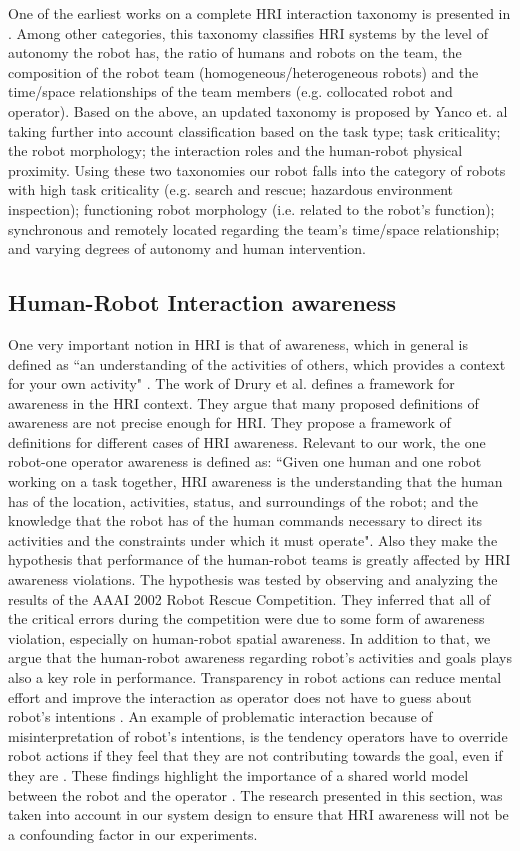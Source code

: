 \documentclass[a4paper,12pt,oneside,openright]{bhamthesis}
\begin{document}
One of the earliest works on a complete HRI interaction taxonomy is presented in \cite{Yanco2002}. Among other categories, this taxonomy classifies HRI systems by the level of autonomy the robot has, the ratio of humans and robots on the team, the composition of the robot team (homogeneous/heterogeneous robots) and the time/space relationships of the team members (e.g. collocated robot and operator). Based on the above, an updated taxonomy is proposed by Yanco et. al \cite{Yanco2004b} taking further into account classification based on the task type; task criticality; the robot morphology; the interaction roles and the human-robot physical proximity. Using these two taxonomies our robot falls into the category of robots with high task criticality (e.g. search and rescue; hazardous environment inspection); functioning robot morphology (i.e. related to the robot's function); synchronous and remotely located regarding the team's time/space relationship; and varying degrees of autonomy and human intervention.

\subsection{Human-Robot Interaction awareness}
One very important notion in HRI is that of awareness, which in general is defined as ``an understanding of the activities of others, which provides a context for your own activity" \cite{Dourish1992}. The work of Drury et al. \cite{Drury2003} defines a framework for awareness in the HRI context. They argue that many proposed definitions of awareness are not precise enough for HRI. They propose a framework of definitions for different cases of HRI awareness. Relevant to our work, the one robot-one operator awareness is defined as: ``Given one human and one robot working on a task together, HRI awareness is the understanding that the human has of the location, activities, status, and surroundings of the robot; and the knowledge that the robot has of the human commands necessary to direct its activities and the constraints under which it must operate". Also they make the hypothesis that performance of the human-robot teams is greatly affected by HRI awareness violations. The hypothesis was tested by observing and analyzing the results of the AAAI 2002 Robot Rescue Competition. They inferred that all of the critical errors during the competition were due to some form of awareness violation, especially on human-robot spatial awareness. In addition to that, we argue that the human-robot awareness regarding robot's activities and goals plays also a key role in performance. Transparency in robot actions can reduce mental effort and improve the interaction as operator does not have to guess about robot's intentions \cite{Goodrich2003}. An example of problematic interaction because of misinterpretation of robot's intentions, is the tendency operators have to override robot actions if they feel that they are not contributing towards the goal, even if they are \cite{Kruijff2012}. These findings highlight the importance of a shared world model between the robot and the operator \cite{Fan2007}. The research presented in this section, was taken into account in our system design to ensure that HRI awareness will not be a confounding factor in our experiments. 
\end{document}
